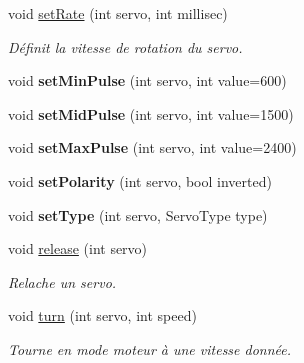 \begin{DoxyCompactItemize}
\mbox{\label{classServoDriver_a27d45f075f5fb2333937ab253a8cce6c}} 
void \hyperlink{classServoDriver_a27d45f075f5fb2333937ab253a8cce6c}{set\+Rate} (int servo, int millisec)
\begin{DoxyCompactList}\small\item\em Définit la vitesse de rotation du servo. \end{DoxyCompactList}\item 
\mbox{\label{classServoDriver_a40ec259cb0ced3154b1e73cc52d48938}} 
void {\bfseries set\+Min\+Pulse} (int servo, int value=600)
\item 
\mbox{\label{classServoDriver_a92d53f7f50a7eb95e14ae358ad0b7d23}} 
void {\bfseries set\+Mid\+Pulse} (int servo, int value=1500)
\item 
\mbox{\label{classServoDriver_aaaeaab97cef5c2ebcd05c265fdff747f}} 
void {\bfseries set\+Max\+Pulse} (int servo, int value=2400)
\item 
\mbox{\label{classServoDriver_af25a01b493392a31ce80bed32a51f97f}} 
void {\bfseries set\+Polarity} (int servo, bool inverted)
\item 
\mbox{\label{classServoDriver_abf685dbc27150bf205fd1e4fc8a7ed0d}} 
void {\bfseries set\+Type} (int servo, Servo\+Type type)
\item 
\mbox{\label{classServoDriver_aa1040b0db7ed851aec70a122301fe665}} 
void \hyperlink{classServoDriver_aa1040b0db7ed851aec70a122301fe665}{release} (int servo)
\begin{DoxyCompactList}\small\item\em Relache un servo. \end{DoxyCompactList}\item 
\mbox{\label{classServoDriver_ad68ebde8a710451c8fea2cd03cfa4bc0}} 
void \hyperlink{classServoDriver_ad68ebde8a710451c8fea2cd03cfa4bc0}{turn} (int servo, int speed)
\begin{DoxyCompactList}\small\item\em Tourne en mode moteur à une vitesse donnée. \end{DoxyCompactList}\item 

\end{DoxyCompactItemize}

